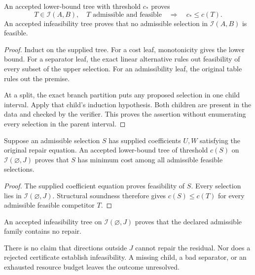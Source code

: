 \begin{theorem}
An accepted lower-bound tree with threshold $c_\ast$ proves
\[
 T\in\mathcal I(A,B),\quad T\text{ admissible and feasible}
 \quad\Longrightarrow\quad c_\ast\leq c(T).
\]
An accepted infeasibility tree proves that no admissible selection in $\mathcal I(A,B)$ is feasible.
\end{theorem}

\begin{proof}
Induct on the supplied tree. For a cost leaf, monotonicity gives the lower bound. For a separator leaf, the exact linear alternative rules out feasibility of every subset of the upper selection. For an admissibility leaf, the original table rules out the premise.

At a split, the exact branch partition puts any proposed selection in one child interval. Apply that child's induction hypothesis. Both children are present in the data and checked by the verifier. This proves the assertion without enumerating every selection in the parent interval.
\end{proof}

\begin{corollary}
Suppose an admissible selection $S$ has supplied coefficients $U,W$ satisfying the original repair equation. An accepted lower-bound tree of threshold $c(S)$ on $\mathcal I(\varnothing,J)$ proves that $S$ has minimum cost among all admissible feasible selections.
\end{corollary}
\begin{proof}
The supplied coefficient equation proves feasibility of $S$. Every selection lies in $\mathcal I(\varnothing,J)$. Structural soundness therefore gives $c(S)\leq c(T)$ for every admissible feasible competitor $T$.
\end{proof}

\begin{corollary}
An accepted infeasibility tree on $\mathcal I(\varnothing,J)$ proves that the declared admissible family contains no repair.
\end{corollary}

There is no claim that directions outside $J$ cannot repair the residual. Nor does a rejected certificate establish infeasibility. A missing child, a bad separator, or an exhausted resource budget leaves the outcome unresolved.

